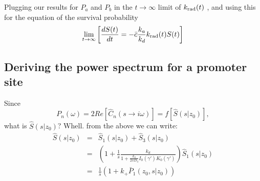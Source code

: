 \documentclass[a4paper,10pt]{article}
\begin{document}
Plugging our results for $P_a$ and $P_b$ in the $t\to\infty$ limit of $k_{\rm rad}(t)$ , and using this for the equation of the survival probability
\begin{equation}
 \lim_{t\to\infty} \left[ \frac{dS(t)}{dt} = -\bar{c} \frac{k_a}{k_d} k_{\rm rad}(t) S(t) \right]
 \elabel{SN}
\end{equation}



\subsection{Deriving the power spectrum for a promoter site}

Since 
\begin{equation}
 P_n(\omega) = 2 Re[ \hat{C}_n(s \to i\omega) ] = f[\hat{S}(s|z_0)],
\end{equation}
what is $\hat{S}(s|z_0)$? Whell. from the above we can write:
\begin{eqnarray}
 \hat{S}(s|z_0) & = & \hat{S}_1(s|z_0) + \hat{S}_3(s|z_0) \\
 & = & \left( 1 + \frac{1}{s} \frac{k_d}{1+\frac{k_a}{2 \pi D_3} I_0(\gamma') K_0(\gamma')}\right)\hat{S}_1(s|z_0) \\
 & = & \frac{1}{s} \left( 1 + k_+ \bar{P}_1(z_0,s|z_0) \right) 
\end{eqnarray}
\end{document}
